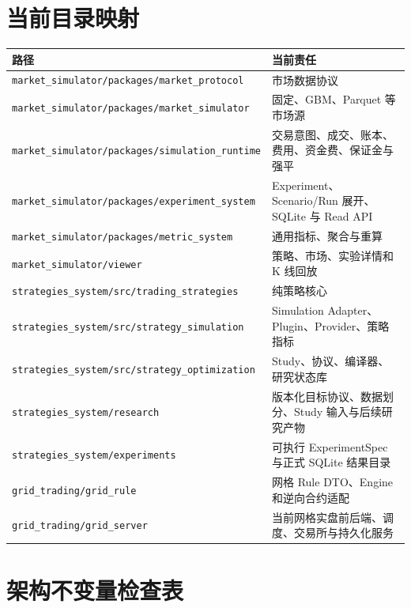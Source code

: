 \documentclass[UTF8,fontset=fandol,11pt,a4paper]{ctexart}
\newcommand{\code}[1]{\nolinkurl{#1}}
\begin{document}
\section{当前目录映射}

\begin{longtable}{>{\raggedright\arraybackslash}p{55mm} p{102mm}}
\toprule
路径 & 当前责任 \\
\midrule
\endhead
\code{market_simulator/packages/market_protocol} & 市场数据协议 \\
\code{market_simulator/packages/market_simulator} & 固定、GBM、Parquet 等市场源 \\
\code{market_simulator/packages/simulation_runtime} & 交易意图、成交、账本、费用、资金费、保证金与强平 \\
\code{market_simulator/packages/experiment_system} & Experiment、Scenario/Run 展开、SQLite 与 Read API \\
\code{market_simulator/packages/metric_system} & 通用指标、聚合与重算 \\
\code{market_simulator/viewer} & 策略、市场、实验详情和 K 线回放 \\
\code{strategies_system/src/trading_strategies} & 纯策略核心 \\
\code{strategies_system/src/strategy_simulation} & Simulation Adapter、Plugin、Provider、策略指标 \\
\code{strategies_system/src/strategy_optimization} & Study、协议、编译器、研究状态库 \\
\code{strategies_system/research} & 版本化目标协议、数据划分、Study 输入与后续研究产物 \\
\code{strategies_system/experiments} & 可执行 ExperimentSpec 与正式 SQLite 结果目录 \\
\code{grid_trading/grid_rule} & 网格 Rule DTO、Engine 和逆向合约适配 \\
\code{grid_trading/grid_server} & 当前网格实盘前后端、调度、交易所与持久化服务 \\
\bottomrule
\end{longtable}

\section{架构不变量检查表}
\end{document}
